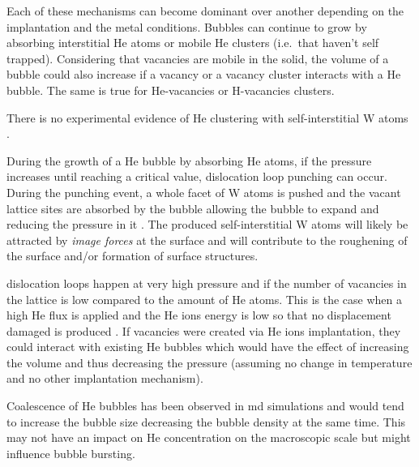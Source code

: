 Each of these mechanisms can become dominant over another depending on the implantation and the metal conditions. 
Bubbles can continue to grow by absorbing interstitial He atoms or mobile He clusters (i.e.\ that haven't self trapped).
Considering that vacancies are mobile in the solid, the volume of a bubble could also increase if a \gls{vacancy} or a \gls{vacancy} cluster interacts with a He bubble.
The same is true for He-vacancies or H-vacancies clusters.

There is no experimental evidence of He clustering with \gls{self-interstitial} \gls{W} atoms .

During the growth of a He bubble by absorbing He atoms, if the pressure increases until reaching a critical value, \gls{dislocation loop} punching can occur.
During the punching event, a whole facet of \gls{W} atoms is pushed and the vacant \gls{lattice} sites are absorbed by the bubble allowing the bubble to expand and reducing the pressure in it .
The produced \gls{self-interstitial} \gls{W} atoms will likely be attracted by \textit{image forces} at the surface and will contribute to the roughening of the surface and/or formation of surface structures.

\Glspl{dislocation loop} happen at very high pressure and if the number of vacancies in the \gls{lattice} is low compared to the amount of He atoms.
This is the case when a high He flux is applied and the He ions energy is low so that no displacement damaged is produced \cite{sefta_surface_2013}.
If vacancies were created via He ions implantation, they could interact with existing He bubbles which would have the effect of increasing the volume and thus decreasing the pressure (assuming no change in temperature and no other implantation mechanism).

Coalescence of He bubbles has been observed in \gls{md} simulations  and would tend to increase the bubble size decreasing the bubble density at the same time.
This may not have an impact on He concentration on the macroscopic scale but might influence bubble bursting.

